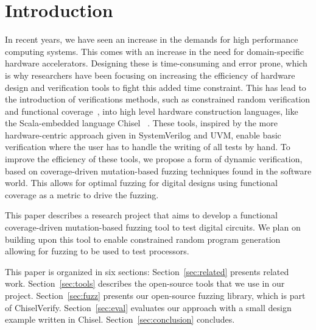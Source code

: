 \documentclass[conference]{IEEEtran}
\newcommand{\martin}[1]{{\color{blue} Martin: #1}}
\begin{document}
\section{Introduction}
\label{sec:intro}

In recent years, we have seen an increase in the demands for high performance computing systems.  
This comes with an increase in the need for domain-specific hardware accelerators.  
Designing these is time-consuming and error prone, which is why researchers have been focusing on increasing the efficiency of hardware design and verification tools to fight this added time constraint.
This has lead to the introduction of verifications methods, such as constrained random verification and functional coverage~\cite{verify:chisel:2020, dobis2021opensource}, into high level hardware construction languages, like the Scala-embedded language Chisel~\cite{chisel:dac2012, chisel:book} .
These tools, inspired by the more hardware-centric approach given in SystemVerilog and UVM, enable basic verification where the user has to handle the writing of all tests by hand.
To improve the efficiency of these tools, we propose a form of dynamic verification, based on coverage-driven mutation-based fuzzing techniques found in the software world.
This allows for optimal fuzzing for digital designs using functional coverage as a metric to drive the fuzzing.

This paper describes a research project that aims to develop a functional coverage-driven mutation-based fuzzing tool to test digital circuits.
We plan on building upon this tool to enable constrained random program generation allowing for fuzzing to be used to test processors.

This paper is organized in six sections: %
Section~\ref{sec:related}  presents related work.
Section~\ref{sec:tools} describes the open-source tools that we use in our project.
Section~\ref{sec:fuzz} presents our open-source fuzzing library, which is part of ChiselVerify.
Section~\ref{sec:eval} evaluates our approach with a small design example written in Chisel.
Section~\ref{sec:conclusion} concludes.
\end{document}
